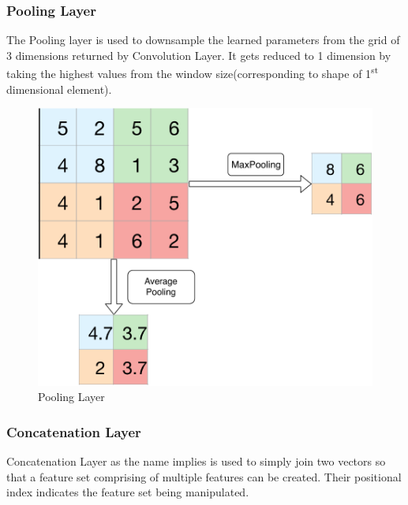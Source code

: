   \subsubsection{Pooling Layer}
  The Pooling layer is used to downsample the learned parameters from the grid of 3 dimensions returned by Convolution Layer. It gets reduced to 1 dimension by taking the highest values from the window size(corresponding to shape of 1\textsuperscript{st} dimensional element).
  \begin{figure}[H] \centering
    \includegraphics[width=.5\linewidth]{mainmatter/3-Methodology/images/pooling.pdf}
    \caption{Pooling Layer}
    \label{fig:pool_layer}
  \end{figure}
  
  \subsubsection{Concatenation Layer}
  Concatenation Layer as the name implies is used to simply join two vectors so that a feature set comprising of multiple features can be created. Their positional index indicates the feature set being manipulated.
  
  \iffalse

